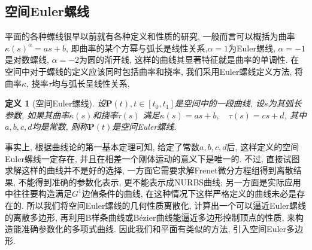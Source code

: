 \documentclass[utf8]{ctexart} %
\newtheorem{definition}{\indent 定义}[section]
\begin{document}
	 \subsection{空间Euler螺线}
	 平面的各种螺线很早以前就有各种定义和性质的研究, 一般而言可以概括为曲率$\kappa(s)^{\alpha} = as+b$, 即曲率的某个方幂与弧长是线性关系,$\alpha=1$为Euler螺线, $\alpha=-1$是对数螺线, $\alpha=-2$为圆的渐开线, 这样的曲线其显著特征就是曲率的单调性. 在空间中对于螺线的定义应该同时包括曲率和挠率, 我们采用Euler螺线定义方法, 将曲率$\kappa$, 挠率$\tau$均与弧长呈线性关系, 
	  \begin{definition}[空间Euler螺线]
	 	设$\boldsymbol{P}(t), t\in[t_0,t_1]$是空间中的一段曲线, 设$s$为其弧长参数, 如果其曲率$\kappa(s)$和挠率$\tau(s)$ 满足$\kappa(s) = as+b,\quad\tau(s) = cs+d$, 其中$a,b,c,d$均是常数, 则称$\boldsymbol{P}(t)$是空间Euler螺线.
	 \end{definition}
	 事实上, 根据曲线论的第一基本定理可知, 给定了常数$a,b,c,d$后, 这样定义的空间Euler螺线一定存在, 并且在相差一个刚体运动的意义下是唯一的. 不过, 直接试图求解这样的曲线并不是好的选择, 一方面它需要求解Frenet微分方程组得到离散结果, 不能得到准确的参数化表示, 更不能表示成NURBS曲线; 另一方面是实际应用中往往要构造满足$G^1$边值条件的曲线, 在这种情况下这样严格定义的曲线未必是存在的. 所以我们将空间Euler螺线的几何性质离散化, 计算出一个可以逼近Euler螺线的离散多边形, 再利用B样条曲线或B\'ezier曲线能逼近多边形控制顶点的性质, 来构造能准确参数化的多项式曲线. 因此我们和平面有类似的方法, 引入空间Euler多边形.
	
\end{document}
